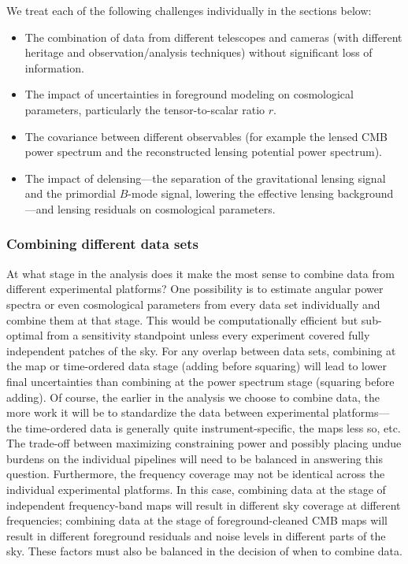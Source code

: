 We treat each of the following challenges individually in the sections below:
\begin{itemize}
\item{The combination of data from different telescopes and cameras (with different heritage 
and observation/analysis techniques) without significant loss of information.}
\item{The impact of uncertainties in foreground modeling on cosmological parameters, particularly the tensor-to-scalar ratio $r$.}
\item{The covariance between different observables (for example the lensed CMB power spectrum and the reconstructed lensing potential power spectrum).}
\item{The impact of delensing---the separation of the gravitational lensing signal and the primordial $B$-mode signal, lowering the effective lensing background---and lensing residuals on cosmological parameters.} 
\end{itemize}


\subsubsection{Combining different data sets}
\label{se:combine}
At what stage in the analysis does it make the most sense to combine data from different experimental platforms? 
One possibility is to estimate
angular power spectra or even cosmological parameters from every data set individually and combine them at that stage. This would
be computationally efficient but sub-optimal from a sensitivity standpoint unless every experiment
covered fully independent patches of the sky. For any overlap between data sets, combining at
the map or time-ordered data stage (adding before squaring) will lead to lower final uncertainties
than combining at the power spectrum stage (squaring before adding). Of course, the earlier in the analysis
we choose to combine data, the more work it will be to standardize the data between experimental platforms---the
time-ordered data is generally quite instrument-specific, the maps less so, etc. The trade-off between
maximizing constraining power and possibly placing undue burdens on the individual  
pipelines will need to be balanced in answering this question.
Furthermore, the frequency coverage may not be identical across the individual experimental platforms.
In this case, combining data at the stage of independent frequency-band maps will result in
different sky coverage at different frequencies; combining data at the stage of foreground-cleaned
CMB maps will result in different foreground residuals and noise levels in different parts of the sky.
These factors must also be balanced in the decision of when to combine data.


